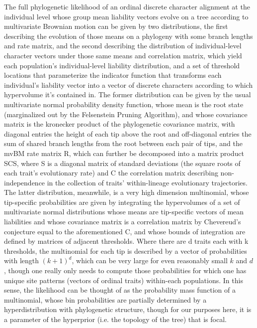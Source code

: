 \documentclass[12pt, twocolumn, twoside]{article}
\begin{document}
The full phylogenetic likelihood of an ordinal discrete character alignment at the individual level whose group mean liability vectors evolve on a tree according to multivariate Brownian motion can be given by two distributions, the first describing the evolution of those means on a phylogeny with some branch lengths and rate matrix, and the second describing the distribution of individual-level character vectors under those same means and correlation matrix, which yield each population's individual-level liability distribution, and a set of threshold locations that parameterize the indicator function that transforms each individual's liability vector into a vector of discrete characters according to which hypervolume it's contained in. The former distribution can be given by the usual multivariate normal probability density function, whose mean is the root state (marginalized out by the Felsenstein Pruning Algorithm), and whose covariance matrix is the kronecker product of the phylogenetic covariance matrix, with diagonal entries the height of each tip above the root and off-diagonal entries the sum of shared branch lengths from the root between each pair of tips, and the mvBM rate matrix R, which can further be decomposed into a matrix product SCS, where S is a diagonal matrix of standard deviations (the square roots of each trait's evolutionary rate) and C the correlation matrix describing non-independence in the collection of traits' within-lineage evolutionary trajectories. The latter distribution, meanwhile, is a very high dimension multinomial, whose tip-specific probabilities are given by integrating the hypervolumes of a set of multivariate normal distributions whose means are tip-specific vectors of mean liabilities and whose covariance matrix is a correlation matrix by Chevereud's conjecture equal to the aforementioned C, and whose bounds of integration are defined by matrices of adjacent thresholds. Where there are d traits each with k thresholds, the multinomial for each tip is described by a vector of probabilities with length $(k+1)^d$, which can be very large for even reasonably small $k$ and $d$, though one really only needs to compute those probabilities for which one has unique site patterns (vectors of ordinal traits) within-each populations. In this sense, the likelihood can be thought of as the probability mass function of a multinomial, whose bin probabilities are partially determined by a hyperdistribution with phylogenetic structure, though for our purposes here, it is a parameter of the hyperprior (i.e. the topology of the tree) that is focal. 
\end{document}
